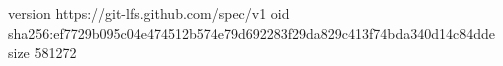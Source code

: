 version https://git-lfs.github.com/spec/v1
oid sha256:ef7729b095c04e474512b574e79d692283f29da829c413f74bda340d14c84dde
size 581272
